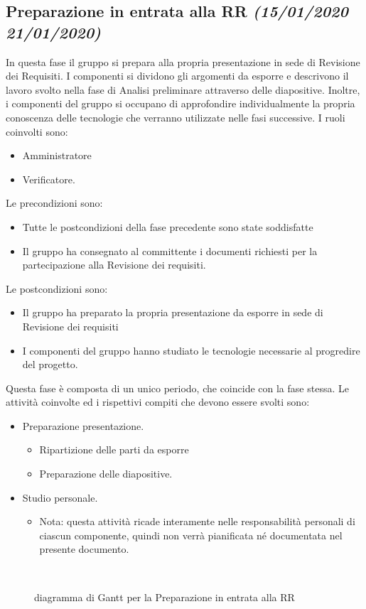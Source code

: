 \documentclass[../piano-di-progetto.tex]{subfiles}
\begin{document}
\subsection[Preparazione in entrata alla RR]{Preparazione in entrata alla RR {\normalsize\normalfont\itshape(15/01/2020  21/01/2020)}}%
\label{sub:preparazione_in_entrata_alla_rr}
In questa fase il gruppo si prepara alla propria presentazione in sede di Revisione dei Requisiti.
I componenti si dividono gli argomenti da esporre e descrivono il lavoro svolto nella fase di Analisi preliminare attraverso delle diapositive.
Inoltre, i componenti del gruppo si occupano di approfondire individualmente la propria conoscenza delle tecnologie che verranno utilizzate nelle fasi successive.
I ruoli coinvolti sono:
\begin{itemize}
  \item Amministratore
  \item Verificatore.
\end{itemize}
Le precondizioni sono:
\begin{itemize}
  \item Tutte le postcondizioni della fase precedente sono state soddisfatte
  \item Il gruppo ha consegnato al committente i documenti richiesti per la partecipazione alla Revisione dei requisiti.
\end{itemize}
Le postcondizioni sono:
\begin{itemize}
  \item Il gruppo ha preparato la propria presentazione da esporre in sede di Revisione dei requisiti
  \item I componenti del gruppo hanno studiato le tecnologie necessarie al progredire del progetto.
\end{itemize}
Questa fase è composta di un unico periodo, che coincide con la fase stessa.
Le attività coinvolte ed i rispettivi compiti che devono essere svolti sono:
\begin{itemize}
  \item Preparazione presentazione.
  \begin{itemize}
    \item Ripartizione delle parti da esporre
    \item Preparazione delle diapositive.
  \end{itemize}
  \item Studio personale.
  \begin{itemize}
    \renewcommand{\labelitemii}{\(\times\)} %
    \item Nota: questa attività ricade interamente nelle responsabilità personali di ciascun componente, quindi non verrà pianificata né documentata nel presente documento.
  \end{itemize}
\end{itemize}
\begin{figure}[H]
  \centering
  
  \caption{diagramma di Gantt per la Preparazione in entrata alla RR}%
~~\label{fig:gantt_preparazione_rr}
\end{figure}
\end{document}
